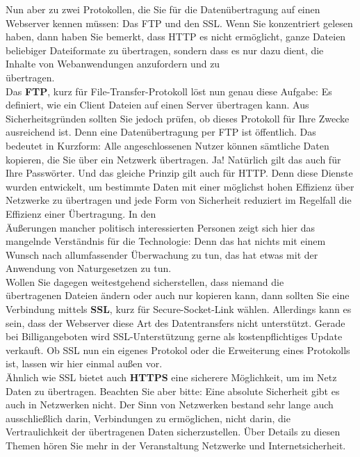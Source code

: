 Nun aber zu zwei Protokollen, die Sie für die Datenübertragung auf einen Webserver kennen müssen: Das FTP und den SSL. Wenn Sie konzentriert gelesen haben, dann haben Sie bemerkt, dass HTTP es nicht ermöglicht, ganze Dateien beliebiger Dateiformate zu übertragen, sondern dass es nur dazu dient, die Inhalte von Webanwendungen anzufordern und zu \\übertragen.\\

Das \textbf{FTP}, kurz für File-Transfer-Protokoll löst nun genau diese Aufgabe: Es definiert, wie ein Client Dateien auf einen Server übertragen kann. Aus Sicherheitsgründen sollten Sie jedoch prüfen, ob dieses Protokoll für Ihre Zwecke ausreichend ist. Denn eine Datenübertragung per FTP ist öffentlich. Das bedeutet in Kurzform: Alle angeschlossenen Nutzer können sämtliche Daten kopieren, die Sie über ein Netzwerk übertragen. Ja! Natürlich gilt das auch für Ihre Passwörter. Und das gleiche Prinzip gilt auch für HTTP. Denn diese Dienste wurden entwickelt, um bestimmte Daten mit einer möglichst hohen Effizienz über Netzwerke zu übertragen und jede Form von Sicherheit reduziert im Regelfall die Effizienz einer Übertragung. In den\\ Äußerungen mancher politisch interessierten Personen zeigt sich hier das mangelnde Verständnis für die Technologie: Denn das hat nichts mit einem Wunsch nach allumfassender Überwachung zu tun, das hat etwas mit der Anwendung von Naturgesetzen zu tun.\\

Wollen Sie dagegen weitestgehend sicherstellen, dass niemand die\\ übertragenen Dateien ändern oder auch nur kopieren kann, dann sollten Sie eine Verbindung mittels \textbf{SSL}, kurz für Secure-Socket-Link wählen. Allerdings kann es sein, dass der Webserver diese Art des Datentransfers nicht unterstützt. Gerade bei Billigangeboten wird SSL-Unterstützung gerne als kostenpflichtiges Update verkauft. Ob SSL nun ein eigenes Protokol oder die Erweiterung eines Protokolls ist, lassen wir hier einmal außen vor.\\

Ähnlich wie SSL bietet auch \textbf{HTTPS} eine sicherere Möglichkeit, um im Netz Daten zu übertragen. Beachten Sie aber bitte: Eine absolute Sicherheit gibt es auch in Netzwerken nicht. Der Sinn von Netzwerken bestand sehr lange auch ausschließlich darin, Verbindungen zu ermöglichen, nicht darin, die Vertraulichkeit der übertragenen Daten sicherzustellen. Über Details zu diesen Themen hören Sie mehr in der Veranstaltung Netzwerke und Internetsicherheit.\\

